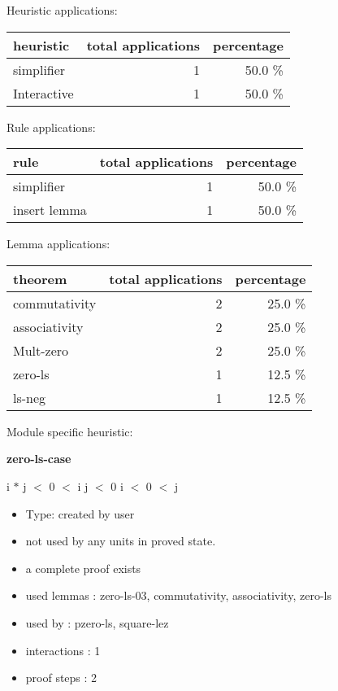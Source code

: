 \documentclass[a4paper]{article}
\begin{document}
\medskip


Heuristic applications:

\begin{supertabular}{l|r|r}
heuristic	& total applications & percentage \\ \hline
simplifier & 1 & 50.0 \% \\
Interactive & 1 & 50.0 \% \\

\end{supertabular}

Rule applications:

\begin{supertabular}{l|r|r}
rule	        & total applications & percentage \\ \hline
simplifier & 1 & 50.0 \% \\
insert lemma & 1 & 50.0 \% \\

\end{supertabular}

Lemma applications:

\begin{supertabular}{l|r|r}
theorem	        & total applications & percentage \\ \hline
commutativity & 2 & 25.0 \% \\
associativity & 2 & 25.0 \% \\
Mult-zero & 2 & 25.0 \% \\
zero-ls & 1 & 12.5 \% \\
ls-neg & 1 & 12.5 \% \\

\end{supertabular}

Module specific heuristic:

\pagebreak

{\LARGE\bf zero-ls-case}\label{lemma-zero-ls-case}

\medskip

 \Fol i $*$ j $<$ 0  $<$ i \And j $<$ 0 \Or i $<$ 0  $<$ j

\begin{itemize}

\item Type: created by user

\item not used by any units in proved state.
\item       a complete proof exists
\item       used lemmas  : zero-ls-03, commutativity, associativity, zero-ls
\item       used by      : pzero-ls, square-lez
\item       interactions : 1
\item       proof steps  : 2
\end{itemize}
\end{document}

